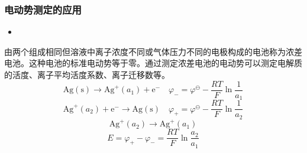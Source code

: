 \documentclass[dvipsnames, svgnames, x11names]{beamer}
\begin{document}
\begin{frame}[t]
    \frametitle{电动势测定的应用}
    \begin{itemize}
        \item[7.] 
    \end{itemize}
    由两个组成相同但溶液中离子浓度不同或气体压力不同的电极构成的电池称为浓差电池。这种电池的标准电动势等于零。通过测定浓差电池的电动势可以测定电解质的活度、离子平均活度系数、离子迁移数等。
    \[
        \mathrm{Ag}(\mathrm{s}) \longrightarrow \mathrm{Ag}^{+}(a_{1})+\mathrm{e}^{-} \quad \varphi_{-}=\varphi^{\ominus}-\frac{R T}{F} \ln \frac{1}{a_{1}}
    \]
    \[
        \mathrm{Ag}^{+}(a_{2})+\mathrm{e}^{-} \longrightarrow \mathrm{Ag}(\mathrm{s}) \quad \varphi_{+}=\varphi^{\ominus}-\frac{R T}{F} \ln \frac{1}{a_{2}}
    \]
    \[
        \mathrm{Ag}^{+}(a_{2}) \longrightarrow \mathrm{Ag}^{+}(a_{1})
    \]
    \[
        E =\varphi_{+}-\varphi_{-}=\frac{R T}{F} \ln \frac{a_{2}}{a_{1}}
    \]
    

\end{frame}
\end{document}
